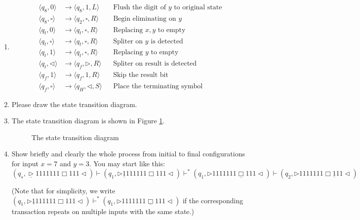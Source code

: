 \documentclass[12pt,a4paper]{article}
\makeatletter
\newtheorem*{solution}{Solution}
\theoremstyle{definition}
\renewenvironment{solution}[1][Solution] {\par\pushQED{\qed}\normalfont\topsep6\p@\@plus6\p@\relax\trivlist\item[\hskip\labelsep\bfseries#1\@addpunct{.}]\ignorespaces}{\popQED\endtrivlist\@endpefalse} \makeatother
\makeatother
\begin{document}
\begin{enumerate}
\begin{enumerate}
\begin{solution}
\begin{align*}
			\langle q_8, 0 \rangle &\rightarrow \langle q_8,1, L\rangle&&\text{Flush the digit of }y\text{ to original state}\\
			\langle q_8, \square \rangle &\rightarrow \langle q_2, \square, R\rangle&&\text{Begin eliminating on }y\\
			\langle q_t, 0\rangle &\rightarrow \langle q_t, \square, R\rangle&&\text{Replacing }x, y\text{ to empty}\\
			\langle q_t, \square \rangle &\rightarrow \langle q_t, \square,R\rangle&&\text{Spliter on }y\text{ is detected}\\
			\langle q_t, 1\rangle &\rightarrow \langle q_t, \square, R\rangle&&\text{Replacing }y\text{ to empty}\\
			\langle q_t, \triangleleft\rangle &\rightarrow \langle q_f, \triangleright, R\rangle&&\text{Spliter on result is detected}\\
			\langle q_f, 1\rangle &\rightarrow \langle q_f, 1, R\rangle&&\text{Skip the result bit}\\
			\langle q_f, \square\rangle &\rightarrow \langle q_H, \triangleleft, S\rangle &&\text{Place the terminating symbol}
		\end{align*}
	\end{solution}
	
	\item
	Please draw the state transition diagram.
	
	\begin{solution}
		The state transition diagram is shown in Figure \ref{fig:std}.
		\begin{figure}[h]
			\centering
			
			\caption{The state transition diagram}
			\label{fig:std}
		\end{figure}
	\end{solution}

	\item
	Show briefly and clearly the whole process from initial to final configurations for input $x = 7$ and $y = 3$. You may start like this:
	$$(q_s,\underline{\triangleright}  1  1  1  1  1  1  1  \Box 1  1  1   \triangleleft)
	\vdash (q_1,\triangleright  \underline{1}  1  1  1  1  1  1  \Box 1  1  1   \triangleleft)
	\vdash^* (q_1,\triangleright  1  1  1  1  1  1  1  \underline{\Box} 1  1  1   \triangleleft)
	\vdash (q_2,\triangleright  1  1  1  1  1  1  1  \Box \underline{1}  1  1   \triangleleft)$$
	
	\par{\color{blue}(Note that for simplicity, we write $(q_1,\triangleright  \underline{1}  1  1  1  1  1  1  \Box 1  1  1   \triangleleft)\vdash^* (q_1,\triangleright  1  1  1  1  1  1  1  \underline{\Box} 1  1  1   \triangleleft)$ if the corresponding transaction repeats on multiple inputs with the same state.)}


\end{enumerate}
\end{enumerate}
\end{document}
